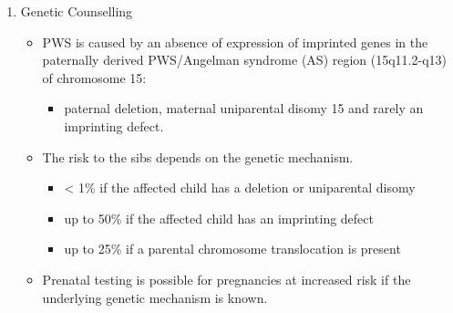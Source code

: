 \documentclass[12pt]{scrartcl}
\begin{document}
\begin{enumerate}
\item Genetic Counselling
\label{sec:org8439f9b}
\begin{itemize}
\item PWS is caused by an absence of expression of imprinted genes in the
paternally derived PWS/Angelman syndrome (AS) region (15q11.2-q13)
of chromosome 15:
\begin{itemize}
\item paternal deletion, maternal uniparental disomy 15 and rarely an imprinting defect.
\end{itemize}
\item The risk to the sibs depends on the genetic mechanism.
\begin{itemize}
\item \textless{} 1\% if the affected child has a deletion or uniparental disomy
\item up to 50\% if the affected child has an imprinting defect
\item up to 25\% if a parental chromosome translocation is present
\end{itemize}
\item Prenatal testing is possible for pregnancies at increased risk if
the underlying genetic mechanism is known.
\end{itemize}
\end{enumerate}
\end{document}
